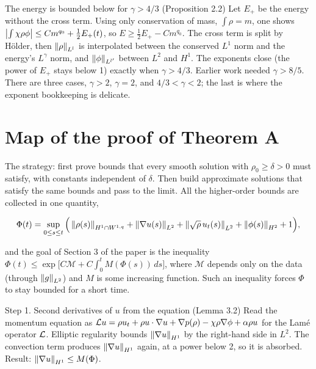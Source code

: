 \begin{stepnew}{\newidea{}The energy is bounded below for $\gamma > 4/3$ (Proposition 2.2)}
Let $E_+$ be the energy without the cross term. Using only conservation of mass, $\int\rho = m$, one shows $\left\lvert \int\chi\rho\phi\right\rvert \le C m^{q_0} + \frac12 E_+(t)$, so $E \ge \frac12 E_+ - Cm^{q_0}$. The cross term is split by Hölder, then $\left\lVert \rho\right\rVert_{L^l}$ is interpolated between the conserved $L^1$ norm and the energy's $L^\gamma$ norm, and $\left\lVert \phi\right\rVert_{L^{l'}}$ between $L^2$ and $H^1$. The exponents close (the power of $E_+$ stays below 1) exactly when $\gamma > 4/3$. Earlier work needed $\gamma > 8/5$. There are three cases, $\gamma > 2$, $\gamma = 2$, and $4/3 < \gamma < 2$; the last is where the exponent bookkeeping is delicate.

\end{stepnew}

\section{Map of the proof of Theorem A}

The strategy: first prove bounds that every smooth solution with $\rho_0 \ge \delta > 0$ must satisfy, with constants independent of $\delta$. Then build approximate solutions that satisfy the same bounds and pass to the limit. All the higher-order bounds are collected in one quantity,

\[
    \Phi(t) = \sup_{0 \le s \le t}\Big( \left\lVert \rho(s)\right\rVert_{H^1 \cap W^{1,q}} + \left\lVert \nabla u(s)\right\rVert_{L^2}
      + \left\lVert \sqrt{\rho}\,u_t(s)\right\rVert_{L^2} + \left\lVert \phi(s)\right\rVert_{H^2} + 1 \Big),
  \]

and the goal of Section 3 of the paper is the inequality $\Phi(t) \le \exp\big[C\mathcal{M} + C\int_0^t M(\Phi(s))\,ds\big]$, where $\mathcal{M}$ depends only on the data (through $\left\lVert g\right\rVert_{L^2}$) and $M$ is some increasing function. Such an inequality forces $\Phi$ to stay bounded for a short time.

\begin{step}{\routine{}Step 1. Second derivatives of $u$ from the equation (Lemma 3.2)}
Read the momentum equation as $\mathcal{L} u = \rho u_t + \rho u\cdot\nabla u + \nabla p(\rho) - \chi\rho\nabla\phi + \alpha\rho u$ for the Lamé operator $\mathcal{L}$. Elliptic regularity bounds $\left\lVert \nabla u\right\rVert_{H^1}$ by the right-hand side in $L^2$. The convection term produces $\left\lVert \nabla u\right\rVert_{H^1}$ again, at a power below 2, so it is absorbed. Result: $\left\lVert \nabla u\right\rVert_{H^1} \le M(\Phi)$.

\end{step}

